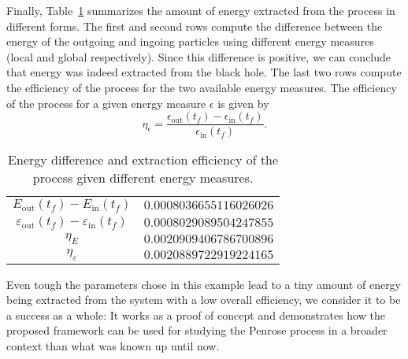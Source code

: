 Finally, Table~\ref{tab:arbitrary_penrose_kerr_example_efficiency} summarizes the amount of energy extracted from the process in different forms. The first and second rows compute the difference between the energy of the outgoing and ingoing particles using different energy measures (local and global respectively). Since this difference is positive, we can conclude that energy was indeed extracted from the black hole. The last two rows compute the efficiency of the process for the two available energy measures. The efficiency of the process for a given energy measure $\epsilon$ is given by
%
\begin{equation}
  \eta_\epsilon = \frac{\epsilon_\text{out}(t_f) - \epsilon_\text{in}(t_f)}{\epsilon_\text{in}(t_f)}.
  \label{eq:arbitrary_penrose_kerr_example_efficiency_formula}
\end{equation}

\begin{table}[]
  \centering
  \begin{tabular}{cc}
    \hline\hline
    $E_\text{out}(t_f)-E_\text{in}(t_f)$                     & $0.0008036655116026026$ \\
    $\varepsilon_\text{out}(t_f)-\varepsilon_\text{in}(t_f)$ & $0.0008029089504247855$ \\
    $\eta_E$                                                 & $0.0020909406786700896$ \\
    $\eta_\varepsilon$                                       & $0.0020889722919224165$ \\ \hline\hline
  \end{tabular}
  \caption{Energy difference and extraction efficiency of the process given different energy measures.}
  \label{tab:arbitrary_penrose_kerr_example_efficiency}
\end{table}

Even tough the parameters chose in this example lead to a tiny amount of energy being extracted from the system with a low overall efficiency, we consider it to be a success as a whole: It works as a proof of concept and demonstrates how the proposed framework can be used for studying the Penrose process in a broader context than what was known up until now.